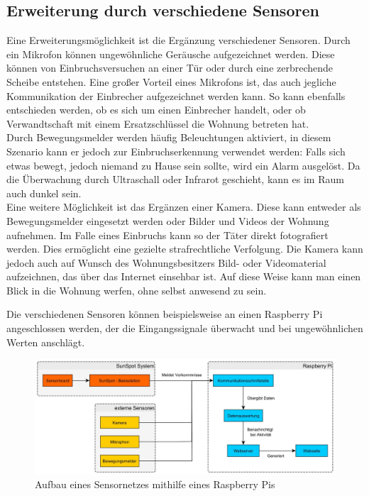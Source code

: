 \subsection{Erweiterung durch verschiedene Sensoren}\label{ss:sensoren}

Eine Erweiterungsmöglichkeit ist die Ergänzung verschiedener Sensoren. 
Durch ein Mikrofon können ungewöhnliche Geräusche aufgezeichnet werden. Diese können von Einbruchsversuchen an einer Tür oder durch eine zerbrechende Scheibe entstehen. Eine großer Vorteil eines Mikrofons ist, das auch jegliche Kommunikation der Einbrecher aufgezeichnet werden kann. So kann ebenfalls entschieden werden, ob es sich um einen Einbrecher handelt, oder ob Verwandtschaft mit einem Ersatzschlüssel die Wohnung betreten hat.\\

Durch Bewegungsmelder werden häufig Beleuchtungen aktiviert, in diesem Szenario kann er jedoch zur Einbruchserkennung verwendet werden: Falls sich etwas bewegt, jedoch niemand zu Hause sein sollte, wird ein Alarm ausgelöst. 
Da die Überwachung durch Ultraschall oder Infrarot geschieht, kann es im Raum auch dunkel sein.\\

Eine weitere Möglichkeit ist das Ergänzen einer Kamera. Diese kann entweder als Bewegungsmelder eingesetzt werden oder Bilder und Videos der Wohnung aufnehmen. Im Falle eines Einbruchs kann so der Täter direkt fotografiert werden. Dies  ermöglicht eine gezielte strafrechtliche Verfolgung. Die Kamera kann jedoch auch auf Wunsch des Wohnungsbesitzers Bild- oder Videomaterial aufzeichnen, das über das Internet einsehbar ist. Auf diese Weise kann man einen Blick in die Wohnung werfen, ohne selbst anwesend zu sein.

Die verschiedenen Sensoren können beispielsweise an einen Raspberry Pi angeschlossen werden, der die Eingangssignale überwacht und bei ungewöhnlichen Werten anschlägt.

\begin{figure}[H] 
	\centering
	\includegraphics[scale=0.232]{Bilder/extSensor}
	\caption{Aufbau eines Sensornetzes mithilfe eines Raspberry Pis}
	\label{f:extSensor}
\end{figure}